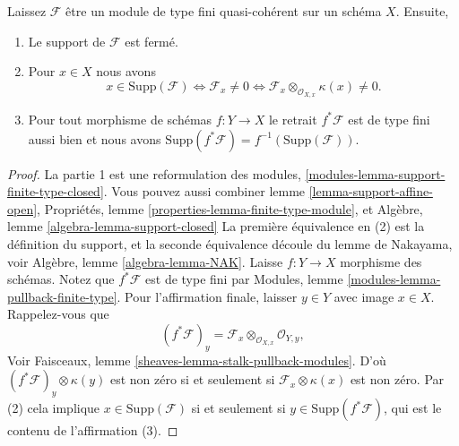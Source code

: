 \begin{lemma}

\label{lemma-support-finite-type}
Laissez $\mathcal{F}$ être un module de type fini quasi-cohérent sur un schéma $X$. Ensuite,
\begin{enumerate}
\item Le support de $\mathcal{F}$ est fermé.
\item Pour $x \in X$ nous avons $$
x \in \text{Supp}(\mathcal{F})
\Leftrightarrow
\mathcal{F}_x \not = 0
\Leftrightarrow
\mathcal{F}_x \otimes_{\mathcal{O}_{X, x}} \kappa(x) \not = 0.
$$
\item Pour tout morphisme de schémas $f : Y \to X$ le retrait $f^*\mathcal{F}$ est de type fini aussi bien et nous avons $\text{Supp}(f^*\mathcal{F}) = f^{-1}(\text{Supp}(\mathcal{F}))$.
\end{enumerate}

\end{lemma}

\begin{proof}

La partie 1 est une reformulation des modules, \ref{modules-lemma-support-finite-type-closed}. Vous pouvez aussi combiner lemme \ref{lemma-support-affine-open}, Propriétés, lemme \ref{properties-lemma-finite-type-module}, et Algèbre, lemme \ref{algebra-lemma-support-closed}
La première équivalence en (2) est la définition du support, et la seconde équivalence découle du lemme de Nakayama, voir Algèbre, lemme \ref{algebra-lemma-NAK}. Laisse $f : Y \to X$ morphisme des schémas. Notez que
$f^*\mathcal{F}$ est de type fini par Modules, lemme \ref{modules-lemma-pullback-finite-type}. Pour l'affirmation finale, laisser $y \in Y$ avec image $x \in X$. Rappelez-vous que
$$
(f^*\mathcal{F})_y =
\mathcal{F}_x \otimes_{\mathcal{O}_{X, x}} \mathcal{O}_{Y, y},
$$
Voir Faisceaux, lemme \ref{sheaves-lemma-stalk-pullback-modules}. D'où $(f^*\mathcal{F})_y \otimes \kappa(y)$ est non zéro si et seulement si $\mathcal{F}_x \otimes \kappa(x)$ est non zéro. Par (2) cela implique $x \in \text{Supp}(\mathcal{F})$ si et seulement si $y \in \text{Supp}(f^*\mathcal{F})$, qui est le contenu de l'affirmation (3).

\end{proof}

